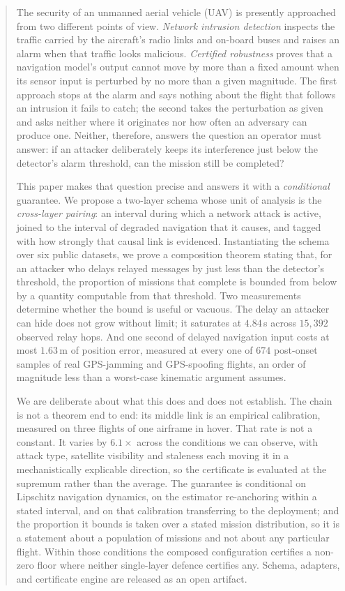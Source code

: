 \begin{abstract}
The security of an unmanned aerial vehicle (UAV) is presently approached from
two different points of view. \emph{Network intrusion detection} inspects the
traffic carried by the aircraft's radio links and on-board buses and raises an
alarm when that traffic looks malicious. \emph{Certified robustness} proves
that a navigation model's output cannot move by more than a fixed amount when
its sensor input is perturbed by no more than a given magnitude. The first
approach stops at the alarm and says nothing about the flight that follows an
intrusion it fails to catch; the second takes the perturbation as given and asks
neither where it originates nor how often an adversary can produce one. Neither,
therefore, answers the question an operator must answer: if an attacker
deliberately keeps its interference just below the detector's alarm threshold,
can the mission still be completed?

This paper makes that question precise and answers it with a
\emph{conditional} guarantee. We propose a two-layer schema whose unit of
analysis is the \emph{cross-layer pairing}: an interval during which a network
attack is active, joined to the interval of degraded navigation that it causes,
and tagged with how strongly that causal link is evidenced. Instantiating the
schema over six public datasets, we prove a composition theorem stating that,
for an attacker who delays relayed messages by just less than the detector's
threshold, the proportion of missions that complete is bounded from below by a
quantity computable from that threshold. Two measurements determine whether the
bound is useful or vacuous. The delay an attacker can hide does not grow without
limit; it saturates at $4.84$\,s across $15{,}392$ observed relay hops. And one
second of delayed navigation input costs at most $1.63$\,m of position error,
measured at every one of $674$ post-onset samples of real GPS-jamming and
GPS-spoofing flights, an order of magnitude less than a worst-case kinematic
argument assumes.

We are deliberate about what this does and does not establish. The chain is not
a theorem end to end: its middle link is an empirical calibration, measured on
three flights of one airframe in hover. That rate is not a constant. It varies
by $6.1\times$ across the conditions we can observe, with attack type, satellite
visibility and staleness each moving it in a mechanistically explicable
direction, so the certificate is evaluated at the supremum rather than the
average. The guarantee is conditional on
Lipschitz navigation dynamics, on the estimator re-anchoring within a stated
interval, and on that calibration transferring to the deployment; and the
proportion it bounds is taken over a stated mission distribution, so it is a
statement about a population of missions and not about any particular flight.
Within those conditions the composed configuration certifies a non-zero floor
where neither single-layer defence certifies any. Schema, adapters, and
certificate engine are released as an open artifact.
\end{abstract}

